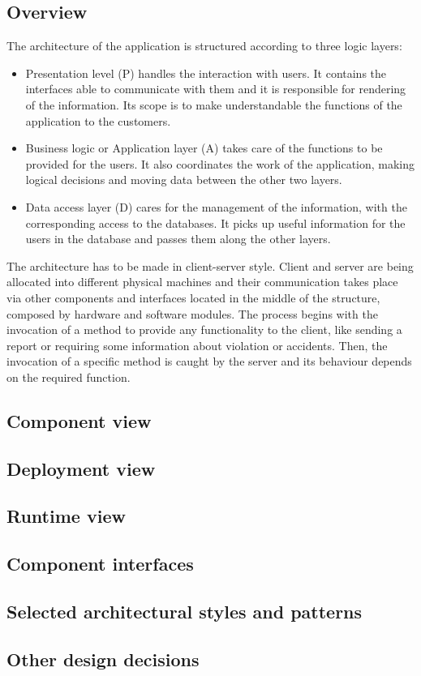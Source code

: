 \subsection{Overview}
The architecture of the application is structured according to three logic layers:
\begin{itemize}
	\item Presentation level (P) handles the interaction with users. It contains the interfaces able to
communicate with them and it is responsible for rendering of the information. Its scope is to make
	understandable the functions of the application to the customers.
	\item Business logic or Application layer (A) takes care of the functions to be provided for the users. It also coordinates the work of the application, making logical decisions and moving data between
	the other two layers.
	\item Data access layer (D) cares for the management of the information, with the corresponding access
to the databases. It picks up useful information for the users in the database and passes them along
the other layers.
\end{itemize}
 
The architecture has to be made in client-server style. Client and server are being allocated into different
physical machines and their communication takes place via other components and interfaces located in the
middle of the structure, composed by hardware and software modules.
The process begins with the invocation of a method to provide any functionality to the client, like sending a
report or requiring some information about violation or accidents. Then, the invocation of a specific
method is caught by the server and its behaviour depends on the required function.
\subsection{Component view}
\subsection{Deployment view}
\subsection{Runtime view}
\subsection{Component interfaces}
\subsection{Selected architectural styles and patterns}
\subsection{Other design decisions} 
